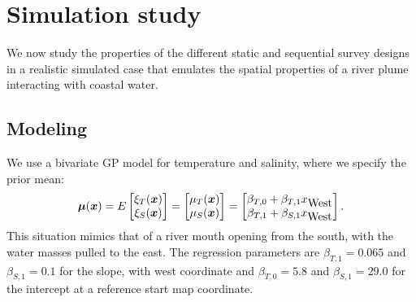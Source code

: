 \documentclass[aoas]{imsart}
\begin{document}
\section{Simulation study}
\label{sec:simulations}

We now study the properties of
the different static and sequential survey designs in a realistic
simulated case that emulates the spatial properties of a river plume interacting with coastal water.

\subsection{Modeling}

We use a bivariate GP model for temperature and salinity, where we
specify the prior mean:
\begin{equation}\label{m}
    \bmu(\bx)=E 
    \begin{bmatrix}
    \xi_T(\bx) \\
    \xi_S(\bx) 
    \end{bmatrix}=\begin{bmatrix} \mu_{T}(\bx)\\
\mu_{S}(\bx)
\end{bmatrix} 
= \begin{bmatrix} \beta_{T,0} + \beta_{T,1} x_{\mbox{West}} \\
\beta_{T,1} + \beta_{S,1} x_{\mbox{West}}
\end{bmatrix}.
\end{equation}
This situation
mimics that of a river mouth opening from the south, with the water
masses pulled to the east. The regression parameters are  $\beta_{T,1}=0.065$ and
$\beta_{S,1}=0.1$ for the slope, with west coordinate and $\beta_{T,0}=5.8$
and $\beta_{S,1}=29.0$ for the intercept at a reference start map coordinate.

\end{document}
